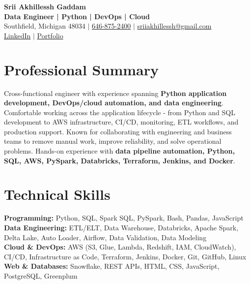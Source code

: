 \documentclass[letterpaper,10pt]{article}
\begin{document}
\fontsize{9.35pt}{10.45pt}\selectfont

\begin{center}
    {\LARGE \textbf{Srii Akhillessh Gaddam}} \\[-1pt]
    \textbf{Data Engineer | Python | DevOps | Cloud} \\[2pt]
    Southfield, Michigan 48034 $|$
    \href{tel:6468752400}{646-875-2400} $|$
    \href{mailto:sriiakhillessh@gmail.com}{sriiakhillessh@gmail.com} \\[1pt]
    \href{https://www.linkedin.com/in/srii-akhiilessh-gaddam-b48668191/}{LinkedIn} $|$
    \href{https://sriiakhillesshg.github.io/portfolio/}{Portfolio}
\end{center}
\vspace{-8pt}

\section{Professional Summary}
\small{Cross-functional engineer with experience spanning \textbf{Python application development, DevOps/cloud automation, and data engineering}. Comfortable working across the application lifecycle - from Python and SQL development to AWS infrastructure, CI/CD, monitoring, ETL workflows, and production support. Known for collaborating with engineering and business teams to remove manual work, improve reliability, and solve operational problems. Hands-on experience with \textbf{data pipeline automation, Python, SQL, AWS, PySpark, Databricks, Terraform, Jenkins, and Docker}.}

\section{Technical Skills}
\small{
\textbf{Programming:} Python, SQL, Spark SQL, PySpark, Bash, Pandas, JavaScript \\
\textbf{Data Engineering:} ETL/ELT, Data Warehouse, Databricks, Apache Spark, Delta Lake, Auto Loader, Airflow, Data Validation, Data Modeling \\
\textbf{Cloud \& DevOps:} AWS (S3, Glue, Lambda, Redshift, IAM, CloudWatch), CI/CD, Infrastructure as Code, Terraform, Jenkins, Docker, Git, GitHub, Linux \\
\textbf{Web \& Databases:} Snowflake, REST APIs, HTML, CSS, JavaScript, PostgreSQL, Greenplum
}
\end{document}
